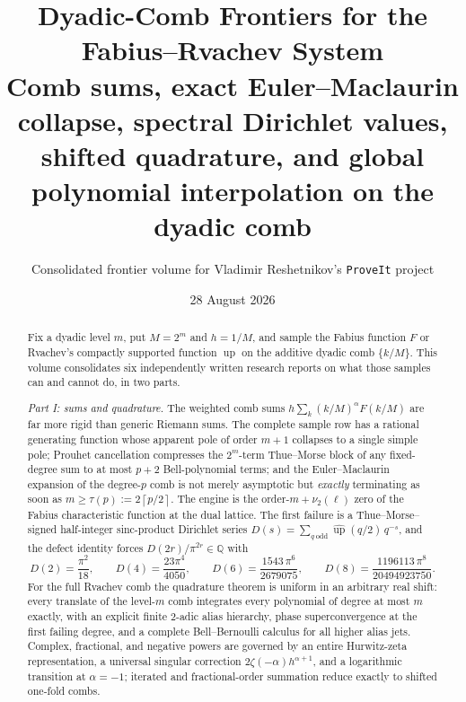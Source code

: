 \documentclass[11pt,oneside]{article}
\title{\bfseries Dyadic-Comb Frontiers for the Fabius--Rvachev System\\[0.4em]
\large Comb sums, exact Euler--Maclaurin collapse, spectral Dirichlet values,\\
shifted quadrature, and global polynomial interpolation on the dyadic comb}
\author{Consolidated frontier volume for Vladimir Reshetnikov's \texttt{ProveIt} project}
\date{28 August 2026}
\numberwithin{equation}{section}
\theoremstyle{definition}
\theoremstyle{remark}
\newcommand{\Q}{\mathbb Q}
\newcommand{\Up}{\operatorname{up}}
\newcommand{\vtwo}{\nu_2}
\newcommand{\ceil}[1]{\left\lceil #1\right\rceil}
\begin{document}
\maketitle

\begin{abstract}
\noindent
Fix a dyadic level $m$, put $M=2^m$ and $h=1/M$, and sample the Fabius
function $F$ or Rvachev's compactly supported function $\Up$ on the
additive dyadic comb $\{k/M\}$.  This volume consolidates six
independently written research reports on what those samples can and
cannot do, in two parts.

\emph{Part I: sums and quadrature.}  The weighted comb sums
$h\sum_k(k/M)^{\alpha}F(k/M)$ are far more rigid than generic Riemann
sums.  The complete sample row has a rational generating function whose
apparent pole of order $m+1$ collapses to a single simple pole; Prouhet
cancellation compresses the $2^m$-term Thue--Morse block of any
fixed-degree sum to at most $p+2$ Bell-polynomial terms; and the
Euler--Maclaurin expansion of the degree-$p$ comb is not merely
asymptotic but \emph{exactly} terminating as soon as
$m\ge\tau(p):=2\ceil{p/2}$.  The engine is the order-$m+\vtwo(\ell)$
zero of the Fabius characteristic function at the dual lattice.  The
first failure is a Thue--Morse--signed half-integer sinc-product
Dirichlet series
$D(s)=\sum_{q\ \mathrm{odd}}\widehat{\Up}(q/2)\,q^{-s}$, and the defect
identity forces $D(2r)/\pi^{2r}\in\Q$ with
\[
 D(2)=\frac{\pi^2}{18},\qquad
 D(4)=\frac{23\pi^4}{4050},\qquad
 D(6)=\frac{1543\,\pi^6}{2679075},\qquad
 D(8)=\frac{1196113\,\pi^8}{20494923750}.
\]
For the full Rvachev comb the quadrature theorem is uniform in an
arbitrary real shift: every translate of the level-$m$ comb integrates
every polynomial of degree at most $m$ exactly, with an explicit
finite $2$-adic alias hierarchy, phase superconvergence at the first
failing degree, and a complete Bell--Bernoulli calculus for all higher
alias jets.  Complex, fractional, and negative powers are governed by an
entire Hurwitz-zeta representation, a universal singular correction
$2\zeta(-\alpha)h^{\alpha+1}$, and a logarithmic transition at
$\alpha=-1$; iterated and fractional-order summation reduce exactly to
shifted one-fold combs.


\end{abstract}
\end{document}
